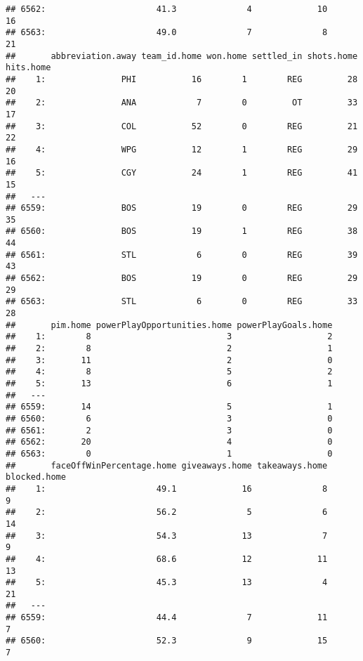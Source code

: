 \documentclass[
]{article}
\begin{document}
\begin{verbatim}
## 6562:                      41.3              4             10           16
## 6563:                      49.0              7              8           21
##       abbreviation.away team_id.home won.home settled_in shots.home hits.home
##    1:               PHI           16        1        REG         28        20
##    2:               ANA            7        0         OT         33        17
##    3:               COL           52        0        REG         21        22
##    4:               WPG           12        1        REG         29        16
##    5:               CGY           24        1        REG         41        15
##   ---                                                                        
## 6559:               BOS           19        0        REG         29        35
## 6560:               BOS           19        1        REG         38        44
## 6561:               STL            6        0        REG         39        43
## 6562:               BOS           19        0        REG         29        29
## 6563:               STL            6        0        REG         33        28
##       pim.home powerPlayOpportunities.home powerPlayGoals.home
##    1:        8                           3                   2
##    2:        8                           2                   1
##    3:       11                           2                   0
##    4:        8                           5                   2
##    5:       13                           6                   1
##   ---                                                         
## 6559:       14                           5                   1
## 6560:        6                           3                   0
## 6561:        2                           3                   0
## 6562:       20                           4                   0
## 6563:        0                           1                   0
##       faceOffWinPercentage.home giveaways.home takeaways.home blocked.home
##    1:                      49.1             16              8            9
##    2:                      56.2              5              6           14
##    3:                      54.3             13              7            9
##    4:                      68.6             12             11           13
##    5:                      45.3             13              4           21
##   ---                                                                     
## 6559:                      44.4              7             11            7
## 6560:                      52.3              9             15            7

\end{verbatim}
\end{document}
